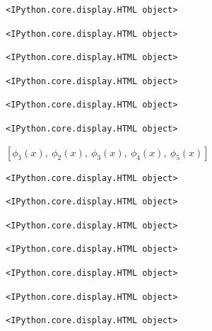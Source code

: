 \documentclass[
  11pt,
  a4paper,
]{scrbook}
\begin{document}
\begin{verbatim}
<IPython.core.display.HTML object>
\end{verbatim}

\begin{verbatim}
<IPython.core.display.HTML object>
\end{verbatim}

\begin{verbatim}
<IPython.core.display.HTML object>
\end{verbatim}

\begin{verbatim}
<IPython.core.display.HTML object>
\end{verbatim}

\begin{verbatim}
<IPython.core.display.HTML object>
\end{verbatim}

\begin{verbatim}
<IPython.core.display.HTML object>
\end{verbatim}

$\displaystyle \left[ \phi_{1}{\left(x \right)}, \  \phi_{2}{\left(x \right)}, \  \phi_{3}{\left(x \right)}, \  \phi_{4}{\left(x \right)}, \  \phi_{5}{\left(x \right)}\right]$

\begin{verbatim}
<IPython.core.display.HTML object>
\end{verbatim}

\begin{verbatim}
<IPython.core.display.HTML object>
\end{verbatim}

\begin{verbatim}
<IPython.core.display.HTML object>
\end{verbatim}

\begin{verbatim}
<IPython.core.display.HTML object>
\end{verbatim}

\begin{verbatim}
<IPython.core.display.HTML object>
\end{verbatim}

\begin{verbatim}
<IPython.core.display.HTML object>
\end{verbatim}

\begin{verbatim}
<IPython.core.display.HTML object>
\end{verbatim}
\end{document}
